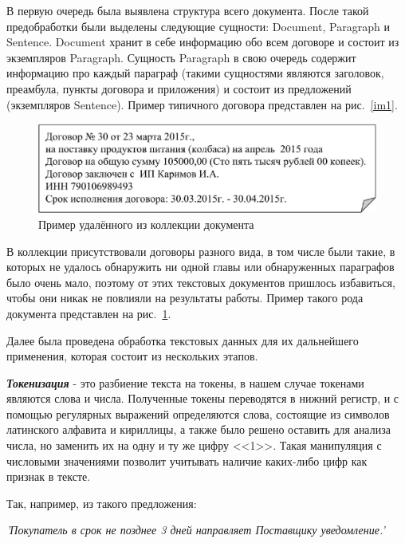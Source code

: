 \documentclass[14pt]{matmex-diploma-custom}
\begin{document}
В первую очередь была выявлена структура всего документа. После такой предобработки были выделены следующие сущности: Document, Paragraph и Sentence. Document хранит в себе информацию обо всем договоре и состоит из экземпляров Paragraph. Сущность Paragraph в свою очередь содержит информацию про каждый параграф (такими сущностями являются заголовок, преамбула, пункты договора и приложения) и состоит из предложений (экземпляров Sentence). Пример типичного договора представлен на рис.~\ref{im1}. 

\vspace{5pt}
\begin{figure}[h!]
	\includegraphics[scale=0.74]{images/im2.eps}
	\caption{Пример удалённого из коллекции документа}
	\label{im2}
\end{figure}
\vspace{5pt}

В коллекции присутствовали договоры разного вида, в том числе были такие, в которых не удалось обнаружить ни одной главы или обнаруженных параграфов было очень мало, поэтому от этих текстовых документов пришлось избавиться, чтобы они никак не повлияли на результаты работы. Пример такого рода документа представлен на рис.~\ref{im2}.

Далее была проведена обработка текстовых данных для их дальнейшего применения, которая состоит из нескольких этапов.

\vspace{5pt}
\textbf{\textit{Токенизация}} - это разбиение текста на токены, в нашем случае токенами являются слова и числа. Полученные токены переводятся в нижний регистр, и с помощью регулярных выражений определяются  слова, состоящие из символов латинского алфавита и кириллицы,  а также было решено оставить для анализа числа, но заменить их на одну и ту же цифру <<1>>. Такая манипуляция с числовыми значениями позволит учитывать наличие каких-либо цифр как признак в тексте. 

\vspace{20pt}
Так, например, из такого предложения:

\vspace{13pt}
\noindent\textit{'Покупатель в срок не позднее 3 дней направляет Поставщику уведомление.'}
\end{document}
